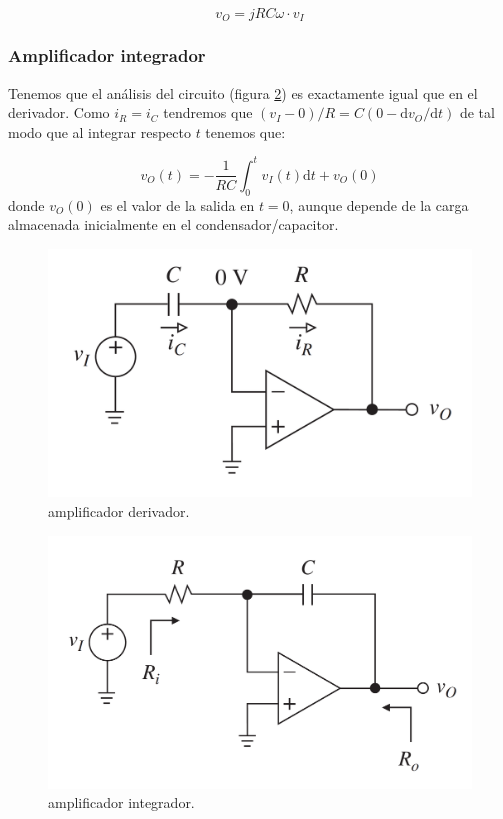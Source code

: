 \documentclass[11pt]{article} %
\newcommand{\D}{\mathrm{d}}
\begin{document}
\begin{equation}
v_O = jRC \omega  \cdot v_I  
\end{equation}


\subsubsection{Amplificador integrador}

Tenemos que el análisis del circuito (figura \ref{Fig:1.3.7-Amplificador-Integrador}) es exactamente igual que en el derivador. Como $i_R = i_C$ tendremos que $(v_I-0) / R = C  (0-\D v_O / \D t)$ de tal modo que al integrar respecto $t$ tenemos que:

\begin{equation}
v_O (t) = - \dfrac{1}{RC} \int_{0}^t v_I (t) \D t + v_O (0)
\end{equation}
donde $v_O (0)$ es el valor de la salida en $t=0$, aunque depende de la carga almacenada inicialmente en el condensador/capacitor. 


\begin{figure}[h!] \centering
\includegraphics[scale=0.3]{1.3.6-Derivador.png}
\caption{amplificador derivador.}
\label{Fig:1.3.6.-Amplificador-Derivador}
\end{figure} 


\begin{figure}[h!] \centering
\includegraphics[scale=0.3]{1.3.7-Integrador.png}
\caption{amplificador integrador.}
\label{Fig:1.3.7-Amplificador-Integrador}
\end{figure} 
\end{document}
